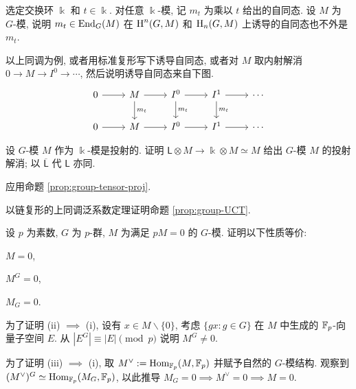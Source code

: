 \begin{Exercises}
	\item 选定交换环 $\Bbbk$ 和 $t \in \Bbbk$. 对任意 $\Bbbk$-模, 记 $m_t$ 为乘以 $t$ 给出的自同态. 设 $M$ 为 $G$-模, 说明 $m_t \in \operatorname{End}_G(M)$ 在 $\operatorname{H}^n(G, M)$ 和 $\operatorname{H}_n(G, M)$ 上诱导的自同态也不外是 $m_t$.
	
	\begin{hint}
		以上同调为例, 或者用标准复形写下诱导自同态, 或者对 $M$ 取内射解消 $0 \to M \to I^0 \to \cdots$, 然后说明诱导自同态来自下图.
		\[\begin{tikzcd}
			0 \arrow[r] & M \arrow[r] \arrow[d, "{m_t}"] & I^0 \arrow[r] \arrow[d, "{m_t}"] & I^1 \arrow[r] \arrow[d, "{m_t}"] & \cdots \\
			0 \arrow[r] & M \arrow[r] & I^0 \arrow[r] & I^1 \arrow[r] & \cdots
		\end{tikzcd}\]
	\end{hint}

	\item 设 $G$-模 $M$ 作为 $\Bbbk$-模是投射的. 证明 $\mathsf{L} \otimes M \to \Bbbk \otimes M \simeq M$ 给出 $G$-模 $M$ 的投射解消; 以 $\overline{\mathsf{L}}$ 代 $\mathsf{L}$ 亦同.
	
	\begin{hint}
		应用命题 \ref{prop:group-tensor-proj}.
	\end{hint}
	
	\item 以链复形的上同调泛系数定理证明命题 \ref{prop:group-UCT}.
	
	
	\item 设 $p$ 为素数, $G$ 为 $p$-群, $M$ 为满足 $pM = 0$ 的 $G$-模. 证明以下性质等价:
	\begin{inparaenum}[(i)]
		\item $M = 0$,
		\item $M^G = 0$,
		\item $M_G = 0$.
	\end{inparaenum}

	\begin{hint}
		为了证明 (ii) $\implies$ (i), 设有 $x \in M \smallsetminus \{0\}$, 考虑 $\{gx: g \in G \}$ 在 $M$ 中生成的 $\mathbb{F}_p$-向量子空间 $E$. 从 $|E^G| \equiv |E| \pmod{p}$ 说明 $M^G \neq 0$.
		
		为了证明 (iii) $\implies$ (i), 取 $M^\vee := \operatorname{Hom}_{\mathbb{F}_p}(M, \mathbb{F}_p)$ 并赋予自然的 $G$-模结构. 观察到 $(M^\vee)^G \simeq \operatorname{Hom}_{\mathbb{F}_p}(M_G, \mathbb{F}_p)$, 以此推导 $M_G = 0 \implies M^\vee = 0 \implies M = 0$.
	\end{hint}


\end{Exercises}
